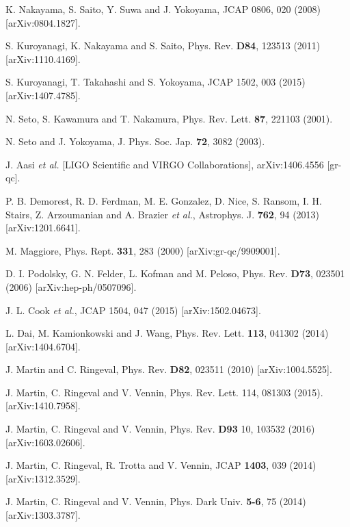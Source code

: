 \documentclass[11pt,a4paper,twoside]{book}
\begin{document}
\begin{thebibliography}{2}
	 K. Nakayama, S. Saito, Y. Suwa and J. Yokoyama, JCAP 0806, 020 (2008) [arXiv:0804.1827].
	
	 S. Kuroyanagi, K. Nakayama and S. Saito, Phys. Rev. \textbf{D84}, 123513 (2011) [arXiv:1110.4169].
	
	 S. Kuroyanagi, T. Takahashi and S. Yokoyama, JCAP 1502, 003 (2015) [arXiv:1407.4785]. 
	
	 N. Seto, S. Kawamura and T. Nakamura, Phys. Rev. Lett. \textbf{87}, 221103 (2001).
	
	 N. Seto and J. Yokoyama, J. Phys. Soc. Jap. \textbf{72}, 3082 (2003).
	
	 J. Aasi \textit{et al.} [LIGO Scientific and VIRGO Collaborations], arXiv:1406.4556 [gr-qc].
	
	 P. B. Demorest, R. D. Ferdman, M. E. Gonzalez, D. Nice, S. Ransom, I. H. Stairs, Z. Arzoumanian and A. Brazier \textit{et al.}, Astrophys. J. \textbf{762}, 94 (2013) [arXiv:1201.6641].
		
	 M. Maggiore, Phys. Rept. \textbf{331}, 283 (2000) [arXiv:gr-qc/9909001].	
	
	 D. I. Podolsky, G. N. Felder, L. Kofman and M. Peloso, Phys. Rev. \textbf{D73}, 023501 (2006) [arXiv:hep-ph/0507096].
	
	 J. L. Cook \textit{et al.}, JCAP 1504, 047 (2015) [arXiv:1502.04673].
	
	 L. Dai, M. Kamionkowski and J. Wang, Phys. Rev. Lett. \textbf{113}, 041302 (2014) [arXiv:1404.6704].
	
	 J. Martin and C. Ringeval, Phys. Rev. \textbf{D82}, 023511 (2010) [arXiv:1004.5525].
	
	 J. Martin, C. Ringeval and V. Vennin, Phys. Rev. Lett. 114, 081303 (2015). [arXiv:1410.7958].
	
	 J. Martin, C. Ringeval and V. Vennin, Phys. Rev. \textbf{D93} 10, 103532 (2016) [arXiv:1603.02606].
	
	 J. Martin, C. Ringeval, R. Trotta and V. Vennin, JCAP \textbf{1403}, 039 (2014) [arXiv:1312.3529].
	
	 J. Martin, C. Ringeval and V. Vennin, Phys. Dark Univ. \textbf{5-6}, 75 (2014) [arXiv:1303.3787].
		
\end{thebibliography}	
	
\end{document}
